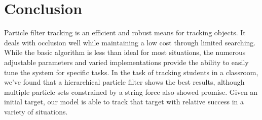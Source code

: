 \documentclass[11pt]{article}
\begin{document}
\section{Conclusion}
\label{sec:conclusion}

Particle filter tracking is an efficient and robust means for tracking objects.  It deals with occlusion well while maintaining a low cost through limited searching.  While the basic algorithm is less than ideal for most situations, the numerous adjustable parameters and varied implementations provide the ability to easily tune the system for specific tasks.  In the task of tracking students in a classroom, we've found that a hierarchical particle filter shows the best results, although multiple particle sets constrained by a string force also showed promise.  Given an initial target, our model is able to track that target with relative success in a variety of situations.  



\newpage
\footnotesize


\end{document}
